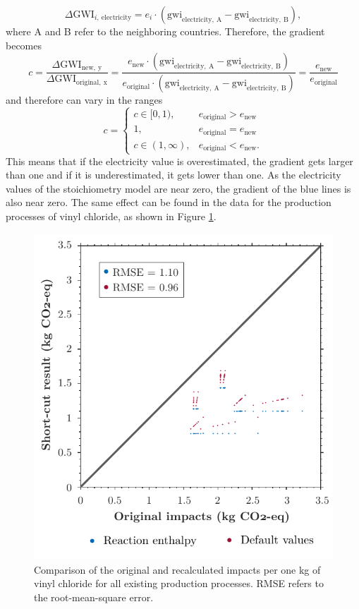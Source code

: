 $$
\Delta \mathrm{GWI}_{i, \ \mathrm{electricity}} = e_{i} \cdot \left( \mathrm{gwi}_{\mathrm{electricity}, \ \mathrm{A}} - \mathrm{gwi}_{\mathrm{electricity}, \ \mathrm{B}}  \right),
$$
where A and B refer to the neighboring countries. Therefore, the gradient becomes
$$
c = \frac{\Delta \mathrm{GWI}_\mathrm{new, \ y}}{\Delta \mathrm{GWI}_\mathrm{original, \ x}} = \frac{e_{\mathrm{new}} \cdot \left( \mathrm{gwi}_{\mathrm{electricity}, \ \mathrm{A}} - \mathrm{gwi}_{\mathrm{electricity}, \ \mathrm{B}}  \right)}{e_{\mathrm{original}} \cdot \left( \mathrm{gwi}_{\mathrm{electricity}, \ \mathrm{A}} - \mathrm{gwi}_{\mathrm{electricity}, \ \mathrm{B}}  \right)} = \frac{e_{\mathrm{new}}}{e_{\mathrm{original}}}
$$
and therefore can vary in the ranges
$$
c = 
\begin{cases}
c \in [0,1),          & e_\mathrm{original} > e_\mathrm{new} \\
1,                  & e_\mathrm{original} = e_\mathrm{new} \\
c \in (1, \infty),     & e_\mathrm{original} < e_\mathrm{new}.
\end{cases}
$$
This means that if the electricity value is overestimated, the gradient gets larger than one and if it is underestimated, it gets lower than one. 
As the electricity values of the stoichiometry model are near zero, the gradient of the blue lines is also near zero.
The same effect can be found in the data for the production processes of vinyl chloride, as shown in Figure \ref{fig:vinylchloride}.

    
    
\begin{figure}[htp!]
        \centering
        \includegraphics{images/vinylchloride.pdf}
        \caption{Comparison of the original and recalculated impacts per one kg of vinyl chloride for all existing production processes. RMSE refers to the root-mean-square error.}
        \label{fig:vinylchloride}
\end{figure}


